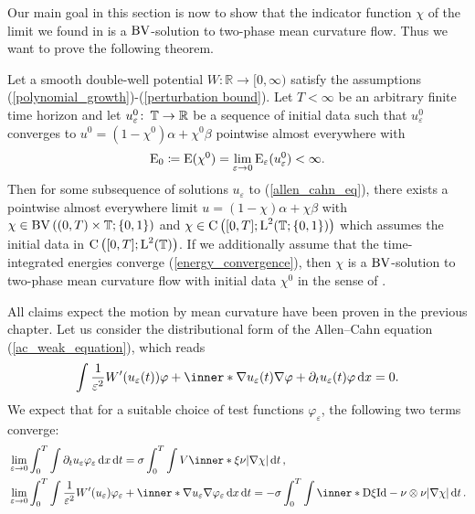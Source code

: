 Our main goal in this section is now to show that the indicator function $ \chi 
$ of the limit we
found in  is a $ \operatorname{BV} $-solution to two-phase 
mean curvature flow. Thus we want to prove the following theorem.
\begin{theorem}
	\label{convergence_to_twophase_mcf}
	Let a smooth double-well potential $ W \colon \mathbb{ R } \to [ 0, \infty 
	) 
	$ satisfy the assumptions (\ref{polynomial_growth})-(\ref{perturbation 
		bound}). 
	Let $ T < \infty $ be an arbitrary finite time horizon and let
	 $ u_{ \varepsilon }^{ 0 } \colon \operatorname{\mathbb{T}} \to 
	\mathbb{ R } $ be a sequence of initial data such that $ u_{ \varepsilon 
	}^{ 0 } $ converges to $ u^{ 0 } 
	= ( 1- 
	\chi^{ 0} ) \alpha 
	+ \chi^{ 0 } \beta $ pointwise almost everywhere with 
	\begin{equation*}
		\operatorname{E}_{ 0 }
		\coloneqq
		\operatorname{E} ( \chi^{ 0 } )
		=
		\lim_{ \varepsilon \to 0 }
		\operatorname{E}_{ \varepsilon } ( u_{ \varepsilon}^{ 0 } )
		< 
		\infty.
	\end{equation*}
	Then for some subsequence of solutions $ u_{ \varepsilon } $ 
	to 
	(\ref{allen_cahn_eq}), there exists a pointwise 
	almost everywhere limit $ u = ( 1 - \chi ) \alpha + \chi \beta $ with $ 
	\chi \in \operatorname{BV} \left( ( 0, T ) \times \operatorname{\mathbb{T}} ; \{ 0 , 1 \} \right) $ and
	$ \chi \in \operatorname{C} \left( [ 0 , T ] ; \operatorname{L}^{ 2 } (\operatorname{\mathbb{T}} ; \{ 0 , 1 \} ) 
	\right) $ which assumes the initial data in $ \operatorname{C} \left( [ 0, T ] ; 
	\operatorname{L}^{ 2 }( \operatorname{\mathbb{T}} ) \right) $. If we additionally assume that the 
	time-integrated energies converge (\ref{energy_convergence}), then $ \chi 
	$ is a $ \operatorname{BV} $-solution to two-phase mean curvature flow with initial data 
	$ \chi^{ 0 } $ in the sense of .
\end{theorem} 
All claims expect the motion by mean curvature have been proven in the previous 
chapter.
Let us consider the distributional form of the Allen--Cahn equation 
(\ref{ac_weak_equation}), which reads
\begin{equation*}
	\int
	\frac{ 1 }{ \varepsilon^{ 2 } } W' ( u_{ \varepsilon} ( t ) ) \varphi
	+
	\inner*{ \nabla u_{ \varepsilon } ( t ) }{\nabla \varphi }
	+
	\partial_{ t } u_{ \varepsilon} ( t ) \varphi 
	\dd{x}
	=
	0.
\end{equation*}
We expect that for a suitable choice of test functions $ \varphi_{ \varepsilon 
} 
$, the following two terms converge:
\begin{align*}
	& \lim_{ \varepsilon \to 0 }
	\int_{ 0 }^{ T }
	\int 
	\partial_{ t } u_{ \varepsilon } \varphi_{ \varepsilon }
	\dd{ x }
	\dd{ t }
	=
	\sigma
	\int_{ 0 }^{ T }
	\int
	V \inner*{ \xi }{ \nu }
	\abs{ \nabla \chi }
	\dd{ t },
	\\
	& \lim_{ \varepsilon \to 0 }
	\int_{ 0 }^{ T }
	\int
	\frac{1 }{ \varepsilon^{ 2 } }
	W'( u_{ \varepsilon } )
	\varphi_{ \varepsilon}
	+ 
	\inner*{ \nabla u_{ \varepsilon } }{ \nabla \varphi_{ \varepsilon } }
	\dd{ x }
	\dd{ t }
	=
	- 
	\sigma \int_{ 0 }^{ T }
	\int
	\inner*{ \diff \xi }{ \mathrm{Id} - \nu \otimes \nu }
	\abs{ \nabla \chi }
	\dd{ t }.
\end{align*}

